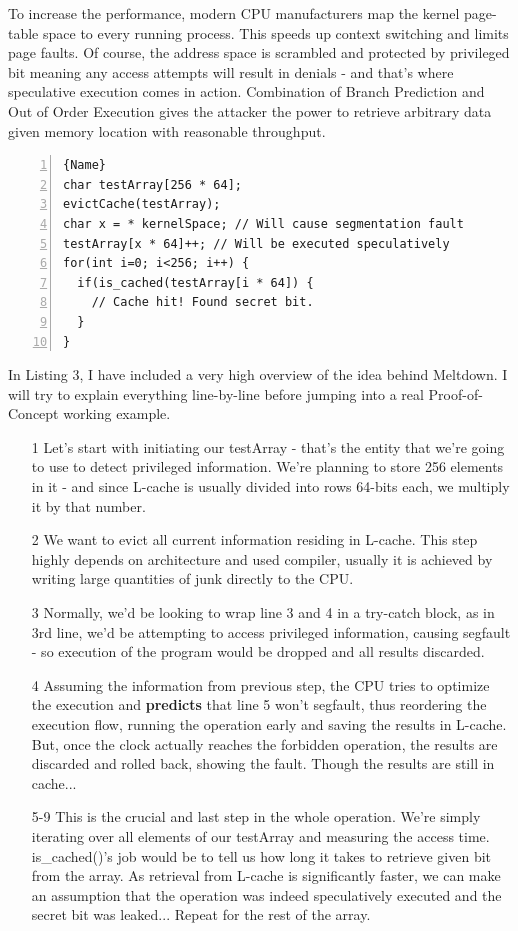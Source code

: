 \documentclass{article}
\begin{document}
To increase the performance, modern CPU manufacturers map the kernel page-table space to every running process. This speeds up context switching and limits page faults. Of course, the address space is scrambled and protected by privileged bit meaning any access attempts will result in denials - and that's where speculative execution comes in action. Combination of Branch Prediction and Out of Order Execution gives the attacker the power to retrieve arbitrary data given memory location with reasonable throughput.

\begin{lstlisting}[caption=Meltdown PoC,frame=tlrb, numbers=left, firstnumber=1]{Name}
char testArray[256 * 64];
evictCache(testArray);
char x = * kernelSpace; // Will cause segmentation fault
testArray[x * 64]++; // Will be executed speculatively
for(int i=0; i<256; i++) {
  if(is_cached(testArray[i * 64]) {
    // Cache hit! Found secret bit.
  }
}
\end{lstlisting}

In Listing 3, I have included a very high overview of the idea behind Meltdown. I will try to explain everything line-by-line before jumping into a real Proof-of-Concept working example.
\begin{enumerate}

  \item [1] Let's start with initiating our testArray - that's the entity that we're going to use to detect privileged information. We're planning to store 256 elements in it - and since L-cache is usually divided into rows 64-bits each, we multiply it by that number. 
  \item [2] We want to evict all current information residing in L-cache. This step highly depends on architecture and used compiler, usually it is achieved by writing large quantities of junk directly to the CPU.
  \item [3] Normally, we'd be looking to wrap line 3 and 4 in a try-catch block, as in 3rd line, we'd be attempting to access privileged information, causing segfault - so execution of the program would be dropped and all results discarded.
  \item [4] Assuming the information from previous step, the CPU tries to optimize the execution and \textbf{predicts} that line 5 won't segfault, thus reordering the execution flow, running the operation early and saving the results in L-cache. But, once the clock actually reaches the forbidden operation, the results are discarded and rolled back, showing the fault. Though the results are still in cache...
  \item [5-9] This is the crucial and last step in the whole operation. We're simply iterating over all elements of our testArray and measuring the access time. is\_cached()'s job would be to tell us how long it takes to retrieve given bit from the array. As retrieval from L-cache is significantly faster, we can make an assumption that the operation was indeed speculatively executed and the secret bit was leaked... Repeat for the rest of the array.

\end{enumerate}
\end{document}
